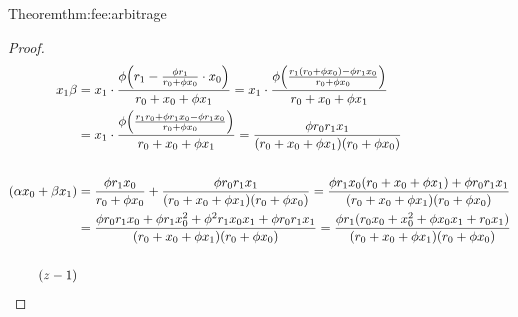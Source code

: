 \begin{proofof}{Theorem}{thm:fee:arbitrage}
\begin{itemize}
\begin{proof}
                \begin{align*}
                    x_1 \valSXb
                    & = x_1 \cdot \frac
                            {\fee \Big ( \ammR[1] - \frac
                                {\fee \ammR[1]}
                                {\ammR[0] + \fee x_0} \cdot x_0
                            \Big )}
                            {\ammR[0] + x_0 + \fee x_1 }
                      = x_1 \cdot \frac
                            {\fee \Big (\frac
                                {\ammR[1] (\ammR[0] + \fee x_0) - \fee \ammR[1] x_0}
                                {\ammR[0] + \fee x_0}
                            \Big )}
                            {\ammR[0] + x_0 + \fee x_1 }
                    \\
                    & = x_1 \cdot \frac
                            {\fee \Big (\frac
                                {\ammR[1] \ammR[0] + \fee \ammR[1] x_0 - \fee \ammR[1] x_0}
                                {\ammR[0] + \fee x_0}
                            \Big )}
                            {\ammR[0] + x_0 + \fee x_1 }
                     = \frac
                            {\fee \ammR[0] \ammR[1] x_1}
                            {(\ammR[0] + x_0 + \fee x_1) (\ammR[0] + \fee x_0)}
                \\
                \\
                    (\valSXa x_0 + \valSXb x_1)
                    & = 
                    \frac{\fee \ammR[1] x_0}{\ammR[0] + \fee x_0} 
                    + 
                    \frac
                        {\fee \ammR[0] \ammR[1] x_1}
                        {(\ammR[0] + x_0 + \fee x_1) (\ammR[0] + \fee x_0)}
                    = 
                    \frac
                        {\fee \ammR[1] x_0 (\ammR[0] + x_0 + \fee x_1) + \fee \ammR[0] \ammR[1] x_1}
                        {(\ammR[0] + x_0 + \fee x_1) (\ammR[0] + \fee x_0)}
                    \\
                    & = 
                    \frac
                        {\fee \ammR[0] \ammR[1] x_0 + \fee \ammR[1] x_0^2 + \fee^2 \ammR[1] x_0 x_1 + \fee \ammR[0] \ammR[1] x_1} 
                        {(\ammR[0] + x_0 + \fee x_1) (\ammR[0] + \fee x_0)}
                    = 
                    \frac
                        {\fee \ammR[1] (\ammR[0] x_0 + x_0^2 + \fee x_0 x_1 + \ammR[0] x_1)} 
                        {(\ammR[0] + x_0 + \fee x_1) (\ammR[0] + \fee x_0)}
                \\
                \\
                    (z-1)

\end{align*}
\end{proof}
\end{itemize}
\end{proofof}
